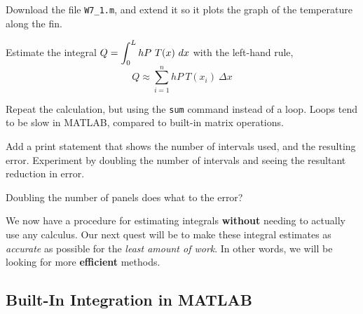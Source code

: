 \newpage

\problem Download the file \texttt{W7\_1.m}, and extend it so it
  plots the graph of the temperature along the fin.

\vsc

\problem Estimate the integral $\displaystyle Q = \int_0^L h P ~T(x) ~dx$ with
  the left-hand rule,
$$ Q \approx \sum_{i=1}^n h P ~T(x_i)~ \Delta x$$

\vsc

\problem Repeat the calculation, but using the \texttt{sum} command
instead of a loop.  Loops tend to be slow in MATLAB, compared to 
built-in matrix operations.

\vsc

\newpage

\problem Add a print statement that shows the number of intervals
  used, and the resulting error.  Experiment by doubling the number of
  intervals and seeing the resultant reduction in error.

\vsc

\problem Doubling the number of panels does what to the error?

\vfill

\newpage





We now have a procedure for estimating integrals {\bf without} needing
to actually use any calculus.  Our next quest will be to make these
integral estimates as {\em accurate} as possible for the {\em least
  amount of work}.  In other words, we will be looking for more {\bf
  efficient} methods.

\newpage

\subsection*{Built-In Integration in MATLAB }


\vsc



